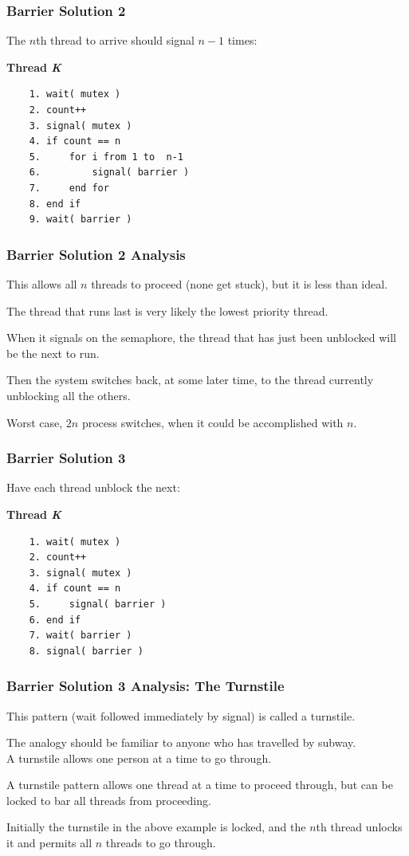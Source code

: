\begin{frame}[fragile]
\frametitle{Barrier Solution 2}

The $n$th thread to arrive should signal $n-1$ times:

\textbf{Thread \textit{K}}\vspace{-6em}
  \begin{verbatim}
	1. wait( mutex )
	2. count++
	3. signal( mutex )
	4. if count == n
	5.     for i from 1 to  n-1
	6.         signal( barrier )
	7.     end for
	8. end if
	9. wait( barrier )
  \end{verbatim}
\vspace{-2em} 




\end{frame}

\begin{frame}
\frametitle{Barrier Solution 2 Analysis}

This allows all $n$ threads to proceed (none get stuck), but it is less than ideal. 

The thread that runs last is very likely the lowest priority thread.

When it signals on the semaphore, the thread that has just been unblocked will be the next to run.

Then the system switches back, at some later time, to the thread currently unblocking all the others. 

Worst case, $2n$ process switches, when it could be accomplished with $n$.


\end{frame}

\begin{frame}[fragile]
\frametitle{Barrier Solution 3}

Have each thread unblock the next:

\textbf{Thread \textit{K}}\vspace{-6em}
  \begin{verbatim}
	1. wait( mutex )
	2. count++
	3. signal( mutex )
	4. if count == n
	5.     signal( barrier )
	6. end if
	7. wait( barrier )
	8. signal( barrier )
  \end{verbatim}
\vspace{-2em}


\end{frame}

\begin{frame}
\frametitle{Barrier Solution 3 Analysis: The Turnstile}

This pattern (wait followed immediately by signal) is called a \alert{turnstile}.

The analogy should be familiar to anyone who has travelled by subway.\\
\quad A turnstile allows one person at a time to go through. 

A turnstile pattern allows one thread at a time to proceed through, but can be locked to bar all threads from proceeding. 

Initially the turnstile in the above example is locked, and the $n$th thread unlocks it and permits all $n$ threads to go through.

\end{frame}

